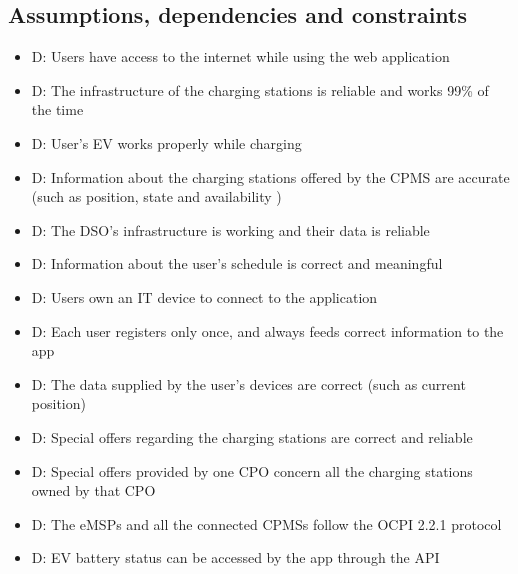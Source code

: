 \documentclass[table, 12pt]{article} %
\begin{document}
    \subsection{Assumptions, dependencies and constraints}
    \begin{itemize}
        \item {}D: Users have access to the internet while using the web application
        \item {}D: The infrastructure of the charging stations is reliable and works 99\% of the time
        \item {}D: User's EV works properly while charging
        \item {}D: Information about the charging stations offered by the CPMS are accurate (such as position, state and availability )
        \item {}D: The DSO's infrastructure is working and their data is reliable 
        \item {}D: Information about the user's schedule is correct and meaningful
        \item {}D: Users own an IT device to connect to the application
        \item {}D: Each user registers only once, and always feeds correct information to the app     
        \item {}D: The data supplied by the user's devices are correct (such as current position)
        \item {}D: Special offers regarding the charging stations are correct and reliable
        \item {}D: Special offers provided by one CPO concern all the charging stations owned by that CPO
        \item {}D: The eMSPs and all the connected CPMSs follow the OCPI 2.2.1 protocol
        \item {}D: EV battery status can be accessed by the app through the API
       \end{itemize}
\end{document}
